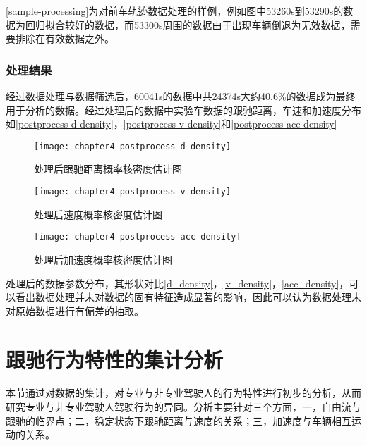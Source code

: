 \autoref{sample-processing}为对前车轨迹数据处理的样例，例如图中53260s到53290s的数据为回归拟合较好的数据，而53300s周围的数据由于出现车辆倒退为无效数据，需要排除在有效数据之外。


\subsubsection{处理结果}
\label{process-result}
经过数据处理与数据筛选后，60041s的数据中共24374s大约40.6\%的数据成为最终用于分析的数据。经过处理后的数据中实验车数据的跟驰距离，车速和加速度分布如\autoref{postprocess-d-density}，\autoref{postprocess-v-density}和\autoref{postprocess-acc-density}


\begin{figure}[htbp]
\begin{minipage}[t]{0.3\linewidth}
\centering
\texttt{[image: chapter4-postprocess-d-density]}
\caption{处理后跟驰距离概率核密度估计图}
\label{postprocess-d-density}
\end{minipage}%
\hspace*{0.05\linewidth}
\begin{minipage}[t]{0.3\linewidth}
\centering
\texttt{[image: chapter4-postprocess-v-density]}
\caption{处理后速度概率核密度估计图}
\label{postprocess-v-density}
\end{minipage}
\hspace*{0.05\linewidth}
\centering
\texttt{[image: chapter4-postprocess-acc-density]}
\caption{处理后加速度概率核密度估计图}
\label{postprocess-acc-density}
\end{figure}


处理后的数据参数分布，其形状对比\autoref{d_density}，\autoref{v_density}，\autoref{acc_density}，可以看出数据处理并未对数据的固有特征造成显著的影响，因此可以认为数据处理未对原始数据进行有偏差的抽取。

\section{跟驰行为特性的集计分析}
本节通过对数据的集计，对专业与非专业驾驶人的行为特性进行初步的分析，从而研究专业与非专业驾驶人驾驶行为的异同。分析主要针对三个方面，一，自由流与跟驰的临界点；二，稳定状态下跟驰距离与速度的关系；三，加速度与车辆相互运动的关系。

